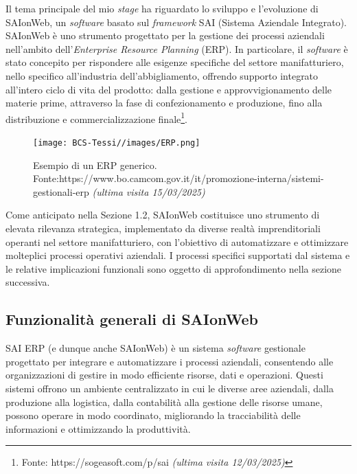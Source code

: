     Il tema principale del mio \textit{stage} ha riguardato lo sviluppo e l’evoluzione di SAIonWeb, un \textit{software} basato sul \textit{framework} SAI (Sistema Aziendale Integrato). SAIonWeb è uno strumento progettato per la gestione dei processi aziendali nell’ambito dell’\textit{Enterprise Resource Planning} (ERP). In particolare, il \textit{software} è stato concepito per rispondere alle esigenze specifiche del settore manifatturiero, nello specifico all'industria dell'abbigliamento, offrendo supporto integrato all'intero ciclo di vita del prodotto: dalla gestione e approvvigionamento delle materie prime, attraverso la fase di confezionamento e produzione, fino alla distribuzione e commercializzazione finale\footnote{Fonte: https://sogeasoft.com/p/sai \textit{(ultima visita 12/03/2025)}}. 

    \begin{figure}[H]
        \centering
        \texttt{[image: BCS-Tessi//images/ERP.png]}
        \caption[Esempio di un ERP generico]{Esempio di un ERP generico. Fonte:https://www.bo.camcom.gov.it/it/promozione-interna/sistemi-gestionali-erp \textit{(ultima visita 15/03/2025)}}
        \label{fig:ERP}
    \end{figure}

    \vspace{0.2 em}
    \noindent Come anticipato nella Sezione 1.2, SAIonWeb costituisce uno strumento di elevata rilevanza strategica, implementato da diverse realtà imprenditoriali operanti nel settore manifatturiero, con l'obiettivo di automatizzare e ottimizzare molteplici processi operativi aziendali. I processi specifici supportati dal sistema e le relative implicazioni funzionali sono oggetto di approfondimento nella sezione successiva.
    
        \subsection{Funzionalità generali di SAIonWeb}
        SAI ERP (e dunque anche SAIonWeb) è un sistema \textit{software} gestionale progettato per integrare e automatizzare i processi aziendali, consentendo alle organizzazioni di gestire in modo efficiente risorse, dati e operazioni. Questi sistemi offrono un ambiente centralizzato in cui le diverse aree aziendali, dalla produzione alla logistica, dalla contabilità alla gestione delle risorse umane, possono operare in modo coordinato, migliorando la tracciabilità delle informazioni e ottimizzando la produttività.  

